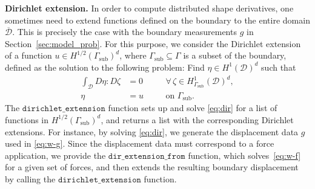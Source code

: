 \documentclass[preprint,9pt]{elsarticle}
\begin{document}
\vspace{0.5cm}
\noindent\textbf{Dirichlet extension.}
In order to compute distributed shape derivatives,
one sometimes need to extend functions defined on
the boundary to the entire domain $\overline{\mathcal{D}}$. 
This is precisely the case with the boundary measurements $g$ in
Section~\ref{sec:model_prob}. 
For this purpose, we consider the Dirichlet extension of a function
$u\in H^{1/2}(\Gamma_{\text{sub}})^{d}$,
where $\Gamma_{\text{sub}}\subseteq\Gamma$ is a subset of the boundary,
defined as the solution to the following problem:
Find $\eta\in H^1(\mathcal{D})^{d}$ such that
\begin{equation}\label{eq:dir}
\begin{aligned}
	\int_{\mathcal{D}} D\eta \colon\! D\zeta &= 0
	&&\quad\forall\, \zeta\in H^1_{\Gamma_{\text{sub}}}(\mathcal{D})^{d}, \\
	\eta &= u &&\quad \text{on } \Gamma_{\text{sub}}.
\end{aligned}
\end{equation}
The $\texttt{dirichlet\_extension}$ function 
sets up and solve \eqref{eq:dir} for a list
of functions in $H^{1/2}(\Gamma_{\text{sub}})^{d}$, and returns
a list with the corresponding Dirichlet extensions.
For instance, by solving \eqref{eq:dir},
we generate the displacement data $g$ used in \eqref{eq:w-g}.
Since the displacement data must correspond to a force application,
we provide the $\texttt{dir\_extension\_from}$ function, which
solves~\eqref{eq:w-f} for a given set of forces,
and then extends the resulting boundary displacement by calling
the $\texttt{dirichlet\_extension}$ function.
\end{document}
